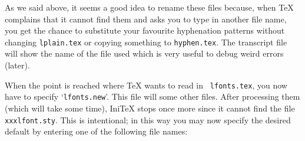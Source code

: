  As we said above,
 it seems a good idea to rename these files because, when \TeX{}
 complains that it cannot find them and asks you to type in another
 file name, you get the chance to substitute
 your favourite hyphenation patterns without changing {\tt lplain.tex}
 or copying something to {\tt hyphen.tex}.
 The transcript file
 will show the name of the file used which is very useful to debug
 weird errors (later).

 When the point is reached where \TeX{} wants to read in {\tt
 lfonts.tex}, you now have to specify `{\tt lfonts.new}'. This file
 will \verb++ some other files.  After processing them
 (which will take some time), Ini\TeX{} stops once more since it cannot
 find the file {\tt xxxlfont.sty}.  This is intentional; 
 in this way
 you may now specify the desired default by entering one of the following
 file names:
